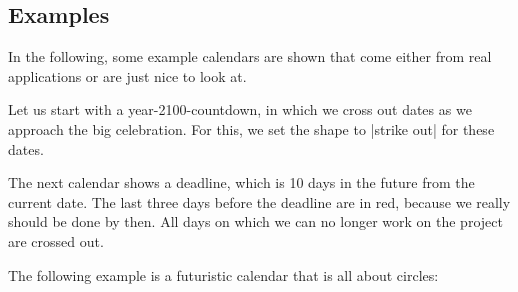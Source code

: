 \subsection{Examples}

In the following, some example calendars are shown that come either
from real applications or are just nice to look at.

Let us start with a year-2100-countdown, in which we cross out dates
as we approach the big celebration. For
this, we set the shape to |strike out| for these dates.

\begin{codeexample}
\end{codeexample}

The next calendar shows a deadline, which is 10 days in the future
from the current date. The last three days before the deadline are in
red, because we really should be done by then. All days on which we
can no longer work on the project are crossed out.

\begin{codeexample}
\end{codeexample}

The following example is a futuristic calendar that is all about circles:

